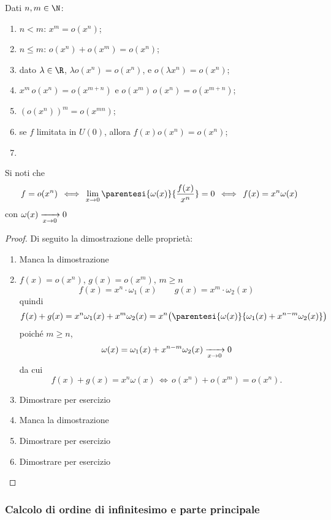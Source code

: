 Dati $ n, m \in \N $: \begin{enumerate}
    \item $ n<m $: $ x^{m}=o(x^{n}) $;
    \item $ n\le m $: $ o(x^{n} ) + o(x^{m}) = o(x^{n}) $;
    \item dato $ \lambda \in \R $, $ \lambda o (x^{n})=o(x^{n}) $, e $ o( \lambda x^{n}) = o(x^{n}) $;
    \item $ x^{m}\,o(x^{n}) = o(x^{m+n}) $ e $ o(x^{m})\,o(x^{n})= o(x^{m+n}) $;
    \item $ \left(o(x^{n})\right)^{m}=o(x^{mn}) $;
    \item se $ f $ limitata in $ U(0) $, allora $ f(x)o(x^{n})=o(x^{n}) $;
    \item 
\end{enumerate}

Si noti che \[
    f=o(x^{n})\,\iff\, \lim_{x\to 0} \parentesi{\omega(x)}{\frac{f(x)}{x^{n}}} =0\,\iff\, f(x)= x^{n}\omega(x)
\] con $ \omega(x) \xrightarrow[x\to 0]{} 0 \displaystyle $

\begin{proof}
    Di seguito la dimostrazione delle proprietà:
    \begin{enumerate}
        \item Manca la dimostrazione %
        \item $ f(x)=o(x^{n}) $, $ g(x)=o(x^{m}) $, $ m\ge n $ \[
            f(x)=x^{n} \cdot \omega_{1}(x)\qquad g(x)=x^{m} \cdot \omega_2(x)  
        \] quindi \[
            f(x)+g(x)=x^{n} \omega_1(x)+ x^{m}\omega_2(x)=x^{n}\bigl(\parentesi{\omega(x)}{\omega_1(x)+x^{n-m}\omega_2(x)}\bigr)
        \] poiché $ m\ge n $, \[
            \omega(x)=\omega_1(x)+x^{n-m}\omega_2(x) \xrightarrow[x\to 0]{} 0 \displaystyle
        \] da cui \[
            f(x)+g(x)=x^{n}\omega(x) \,\iff\, o(x^{n}) + o(x^{m})=o(x^{n}).
        \]
        \item Dimostrare per esercizio %
        \item Manca la dimostrazione%
        \item Dimostrare per esercizio %
        \item Dimostrare per esercizio %
        \qedhere
    \end{enumerate}
\end{proof}

\subsubsection{Calcolo di ordine di infinitesimo e parte principale}


